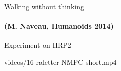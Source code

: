 
\begin{frame}{Walking without thinking}
\framesubtitle{
  \textcolor{green!30!black!80}
  {
    (M. Naveau, Humanoids 2014)
  }
}
\begin{center}
  \hspace*{-1cm}
  \scalebox{0.7}{}
\end{center}

\end{frame}


\begin{frame}{Experiment on HRP2}
  \begin{center}
    {videos/16-raletter-NMPC-short.mp4}
  \end{center}
\end{frame}



